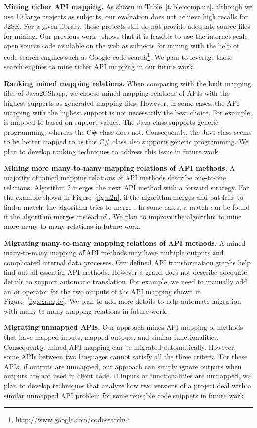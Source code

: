 \textbf{Mining richer API mapping.} As shown in
Table~\ref{table:compare}, although we use 10 large projects as
subjects, our evaluation does not achieve high recalls for J2SE. For
a given library, these projects still do not provide adequate source
files for mining. Our previous
work~\cite{thummalapenta07parseweb,thummalapentaase08spotweb} shows
that it is feasible to use the internet-scale open source code
available on the web as subjects for mining with the help of code
search engines such as Google code
search\footnote{\url{http://www.google.com/codesearch}}. We plan to
leverage those search engines to mine richer API mapping in our
future work.

\textbf{Ranking mined mapping relations.} When comparing with the
built mapping files of Java2CSharp, we choose mined mapping
relations of APIs with the highest supports as generated mapping
files. However, in some cases, the API mapping with the highest
support is not necessarily the best choice. For example,
 is mapped to
 based on support values. The
Java class supports generic programming, whereas the C\# class does
not. Consequently, the Java class seems to be better mapped to
 as this C\# class also
supports generic programming. We plan to develop ranking techniques
to address this issue in future work.

\textbf{Mining more many-to-many mapping relations of API methods.}
A majority of mined mapping relations of API methods describe
one-to-one relations. Algorithm 2 merges the next API method with a
forward strategy. For the example shown in Figure~\ref{fig:n2n}, if
the algorithm merges  and  but
fails to find a match, the algorithm tries to merge
. In some cases, a match can be found if the
algorithm merges  instead of .
We plan to improve the algorithm to mine more many-to-many relations
in future work.

\textbf{Migrating many-to-many mapping relations of API methods.} A
mined many-to-many mapping of API methods may have multiple outputs
and complicated internal data processes. Our defined API
transformation graphs help find out all essential API methods.
However a graph does not describe adequate details to support
automatic translation. For example, we need to manually add an
\emph{or} operator for the two outputs of the API mapping shown in
Figure~\ref{fig:example}. We plan to add more details to help
automate migration with many-to-many mapping relations in future
work.

\textbf{Migrating unmapped APIs.} Our approach mines API mapping of
methods that have mapped inputs, mapped outputs, and similar
functionalities. Consequently, mined API mapping can be migrated
automatically. However, some APIs between two languages cannot
satisfy all the three criteria. For these APIs, if outputs are
unmapped, our approach can simply ignore outputs when outputs are
not used in client code. If inputs or functionalities are unmapped,
we plan to develop techniques that analyze how two versions of a
project deal with a similar unmapped API problem for some reusable
code snippets in future work.
